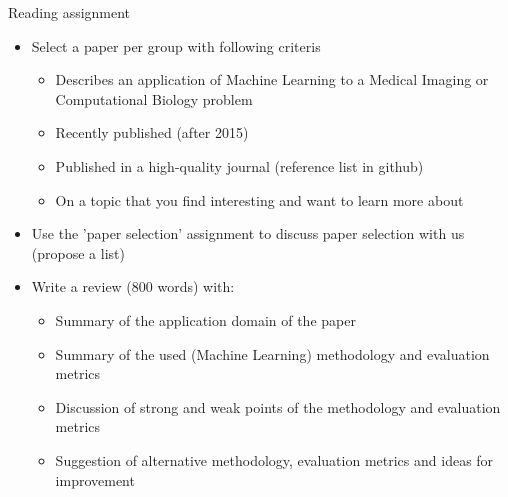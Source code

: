 \documentclass[notes]{beamer}          %
\begin{document}
\begin{frame}{Reading assignment}
\begin{itemize}
    \item Select a paper per group with following criteris
    \begin{itemize}
        \item Describes an application of Machine Learning to a Medical Imaging or Computational Biology problem
		\item Recently published (after 2015)
		\item Published in a high-quality journal (reference list in github)
		\item	 On a topic that you find interesting and want to learn more about
    \end{itemize}
    \item Use the 'paper selection' assignment to discuss paper selection with us (propose a list)
    \item Write a review (800 words) with:
    \begin{itemize}
    		\item Summary of the application domain of the paper
    		\item Summary of the used (Machine Learning) methodology and evaluation metrics
		\item Discussion of strong and weak points of the methodology and evaluation metrics
		\item Suggestion of alternative methodology, evaluation metrics and ideas for improvement
    \end{itemize}
\end{itemize}    
\end{frame}
\end{document}
